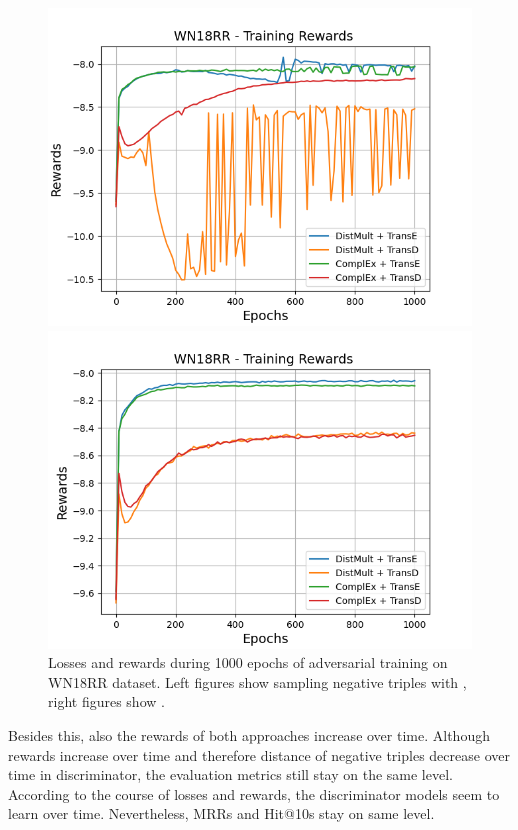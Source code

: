 \begin{figure}[H]
    \begin{minipage}{.5\textwidth}
      \centering
      \includegraphics[width=0.9\linewidth]{figures/results/gan_train/not_pretrained/uncertainty/max/entropy/wn18rr/1k_epochs/uncertainty_wn18rr_rew.png}
    \end{minipage}%
    \begin{minipage}{.5\textwidth}
      \centering
      \includegraphics[width=0.9\linewidth]{figures/results/gan_train/not_pretrained/uncertainty/max_distribution/entropy/wn18rr/1k_epochs/uncertainty_wn18rr_rew.png}
    \end{minipage}%
    \caption{Losses and rewards during 1000 epochs of adversarial training on \textsc{WN18RR} dataset. 
    Left figures show sampling negative triples with \usmax, right figures show \ussoftmax.}
    \label{fig:advtrain_wn18rr_usmax_ussoftmax_losses_rewards}
\end{figure}
Besides this, also the rewards of both approaches increase over time.
Although rewards increase over time and therefore distance of negative triples decrease over time in discriminator, the evaluation metrics still stay on the same level.
According to the course of losses and rewards, the discriminator models seem to learn over time.
Nevertheless, MRRs and Hit@10s stay on same level.
